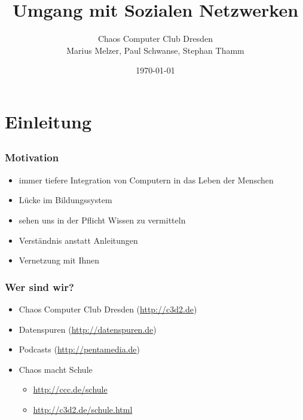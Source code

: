 \documentclass{beamer}
\title{Umgang mit Sozialen Netzwerken}
\author{Chaos Computer Club Dresden\\Marius Melzer, Paul Schwanse, Stephan Thamm}
\date{\today}
\begin{document}
\maketitle

\frame{\tableofcontents[hideallsubsections]}

\section{Einleitung}
\subsection{}

\begin{frame}
  \frametitle{Motivation}
  \begin{itemize}
    \item<2-> immer tiefere Integration von Computern in das Leben der Menschen
    \item<3-> Lücke im Bildungssystem
    \item<4-> sehen uns in der Pflicht Wissen zu vermitteln
    \item<5-> Verständnis anstatt Anleitungen
    \item<6-> Vernetzung mit Ihnen
  \end{itemize}
\end{frame}

\begin{frame}
  \frametitle{Wer sind wir?}
  \begin{itemize}
    \item<2-> Chaos Computer Club Dresden (\url{http://c3d2.de})
      \note{}
    \item<3-> Datenspuren (\url{http://datenspuren.de})
    \item<4-> Podcasts (\url{http://pentamedia.de})
    \item<5-> Chaos macht Schule
      \begin{itemize}
        \item \url{http://ccc.de/schule}
        \item \url{http://c3d2.de/schule.html}
      \end{itemize}
  \end{itemize}
\end{frame}
\end{document}
